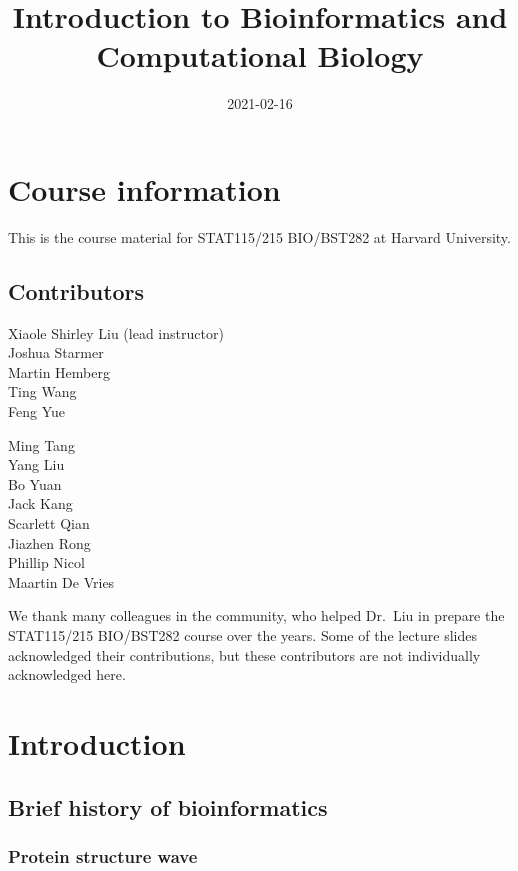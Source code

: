 \documentclass[
]{book}
\title{Introduction to Bioinformatics and Computational Biology}
\author{}
\date{\vspace{-2.5em}2021-02-16}
\begin{document}
\maketitle

{
\setcounter{tocdepth}{1}
\tableofcontents
}
\hypertarget{course-information}{%
\chapter{Course information}\label{course-information}}

This is the course material for STAT115/215 BIO/BST282 at Harvard University.

\hypertarget{contributors}{%
\section{Contributors}\label{contributors}}

Xiaole Shirley Liu (lead instructor)\\
Joshua Starmer\\
Martin Hemberg\\
Ting Wang\\
Feng Yue

Ming Tang\\
Yang Liu\\
Bo Yuan\\
Jack Kang\\
Scarlett Qian\\
Jiazhen Rong\\
Phillip Nicol\\
Maartin De Vries

We thank many colleagues in the community, who helped Dr.~Liu in prepare the STAT115/215 BIO/BST282 course over the years. Some of the lecture slides acknowledged their contributions, but these contributors are not individually acknowledged here.

\hypertarget{intro}{%
\chapter{Introduction}\label{intro}}

\hypertarget{brief-history-of-bioinformatics}{%
\section{Brief history of bioinformatics}\label{brief-history-of-bioinformatics}}

\hypertarget{protein-structure-wave}{%
\subsection{Protein structure wave}\label{protein-structure-wave}}
\end{document}
